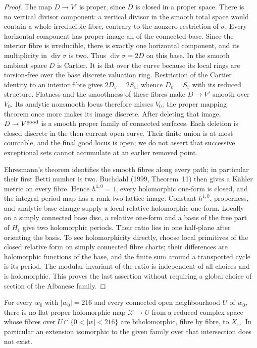 \begin{proof}
The map \(D\to V'\) is proper, since \(D\) is closed in a proper
space. There is no vertical divisor component: a vertical divisor in
the smooth total space would contain a whole irreducible fibre,
contrary to the nonzero restriction of \(\sigma\). Every horizontal
component has proper image all of the connected base. Since the
interior fibre is irreducible, there is exactly one horizontal
component, and its multiplicity in \(\operatorname{div}\sigma\) is
two. Thus \(\operatorname{div}\sigma=2D\) on this base. In the smooth
ambient space \(D\) is Cartier. It is flat over the curve because
its local rings are torsion-free over the base discrete valuation
ring. Restriction of the Cartier identity to an interior fibre gives
\(2D_v=2S_v\), whence \(D_v=S_v\) with its reduced structure.
Flatness and the smoothness of these fibres make \(D\to V'\) smooth
over \(V_0\). Its analytic nonsmooth locus therefore misses \(V_0\);
the proper mapping theorem once more makes its image discrete.
After deleting that image, \(D\to V^{\rm good}\) is a smooth proper
family of connected surfaces. Each deletion is closed discrete in the
then-current open curve. Their finite union is at most countable,
and the final good locus is open; we do not assert that successive
exceptional sets cannot accumulate at an earlier removed point.

Ehresmann's theorem identifies the smooth fibres along every path;
in particular their first Betti number is two. Buchdahl (1999,
Theorem~11) then gives a K\"ahler metric on every fibre. Hence
\(h^{1,0}=1\), every holomorphic one-form is closed, and the integral
period map has a rank-two lattice image. Constant \(h^{1,0}\),
properness, and analytic base change supply a local relative
holomorphic one-form. Locally on a simply connected
base disc, a relative one-form and a basis of the free part of
\(H_1\) give two holomorphic periods. Their ratio lies in one
half-plane after orienting the basis. To see holomorphicity directly,
choose local primitives of the closed relative form on simply
connected fibre charts; their differences are holomorphic functions
of the base, and the finite sum around a transported cycle is its
period. The modular invariant of the ratio is independent of all
choices and is holomorphic. This proves the last assertion without
requiring a global choice of section of the Albanese family.
\end{proof}

\begin{theorem}\label{push:src:D.1.3}
For every \(w_0\) with \(|w_0|=216\) and every connected open
neighbourhood \(U\) of \(w_0\), there is no flat proper holomorphic
map \(\mathcal X\to U\) from a reduced complex space whose fibres
over \(U\cap\{0<|w|<216\}\) are biholomorphic, fibre by fibre, to
\(X_w\). In particular an extension isomorphic to the given family
over that intersection does not exist.
\end{theorem}

